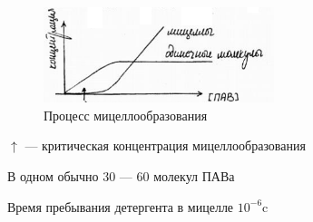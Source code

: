 \begin{lecture}[Седьмая]
	\begin{lecSection}
	
	\begin{figure}
    	\begin{center}
			\includegraphics[width=0.6\textwidth]{lecture_07/pic9}
     	\end{center}
     \caption{Процесс мицеллообразования}
	\end{figure}
	\par $\uparrow$ --- критическая концентрация мицеллообразования
	\par В одном обычно 30 --- 60 молекул ПАВа
	\par Время пребывания детергента в мицелле $10^{-6} \text{c}$
	
	\end{lecSection}
		
\end{lecture}
